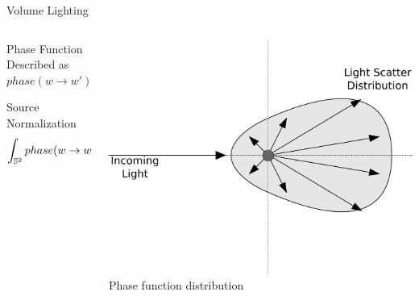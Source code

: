\documentclass[10pt,compress,professionalfont]{beamer}
\begin{document}
\begin{frame}{Volume Lighting}


    \begin{columns}
        \begin{column}{0.5\textwidth}

            \vspace{-10mm}
            \begin{block}{Phase Function}
                Described as $phase(w \to w')$
            \end{block}

            \begin{block}{Source Normalization}
                \[
                    \int_{\mathbb{S}^2}phase(w \to w')\textup{d}w' = 1.
                \]
            \end{block}

        \end{column}
        \begin{column}{0.5\textwidth}
            \vspace{-4mm}
            \includegraphics[width=\textwidth]{../img/diag/phase_func_sm}\\
            {\centering\scriptsize Phase function distribution\\}
        \end{column}
    \end{columns}

\end{frame}
\end{document}
